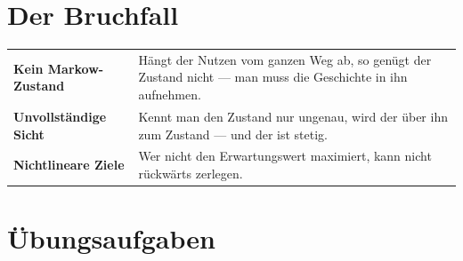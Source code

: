 \section{Der Bruchfall}

\begin{warnung}
\begin{center}
{\small
\renewcommand{\arraystretch}{1.52}
\begin{tabular}{@{}P{2.8cm}P{5.8cm}@{}}
\toprule
\textbf{Kein Markow-Zustand} & Hängt der Nutzen vom ganzen Weg ab, so genügt der Zustand nicht --- man muss die Geschichte in ihn aufnehmen.\\
\textbf{Unvollständige Sicht} & Kennt man den Zustand nur ungenau, wird der  über ihn zum Zustand --- und der ist stetig.\\
\textbf{Nichtlineare Ziele} & Wer nicht den Erwartungswert maximiert, kann nicht rückwärts zerlegen.\\
\bottomrule
\end{tabular}}
\end{center}

\begin{center}
\begin{minipage}{0.88\textwidth}
\end{minipage}
\end{center}
\end{warnung}

\section{Übungsaufgaben}

